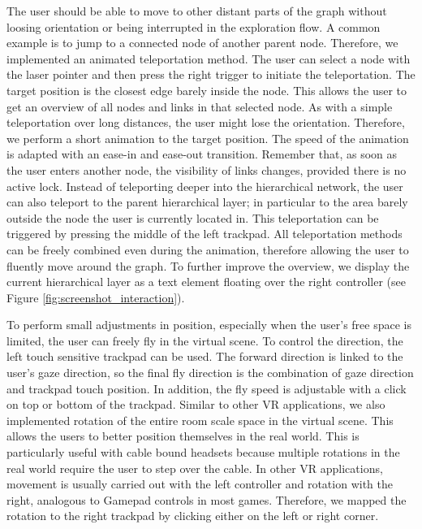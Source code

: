 The user should be able to move to other distant parts of the graph without loosing orientation or being interrupted in the exploration flow. A common example is to jump to a connected node of another parent node. 
Therefore, we implemented an animated teleportation method. The user can select a node with the laser pointer and then press the right trigger to initiate the teleportation. The target position is the closest edge barely inside the node. This allows the user to get an overview of all nodes and links in that selected node.   
As with a simple teleportation over long distances, the user might lose the orientation. Therefore, we perform a short animation to the target position. The speed of the animation is adapted with an ease-in and ease-out transition.
Remember that, as soon as the user enters another node, the visibility of links changes, provided there is no active lock.
Instead of teleporting deeper into the hierarchical network, the user can also teleport to the parent hierarchical layer; in particular to the area barely outside the node the user is currently located in. This teleportation can be triggered by pressing the middle of the left trackpad.
All teleportation methods can be freely combined even during the animation, therefore allowing the user to fluently move around the graph. 
To further improve the overview, we display the current hierarchical layer as a text element floating over the right controller (see Figure \ref{fig:screenshot_interaction}). 

To perform small adjustments in position, especially when the user's free space is limited, the user can freely fly in the virtual scene. To control the direction, the left touch sensitive trackpad can be used. 
The forward direction is linked to the user's gaze direction, so the final fly direction is the combination of gaze direction and trackpad touch position. 
In addition, the fly speed is adjustable with a click on top or bottom of the trackpad.    
Similar to other VR applications, we also implemented rotation of the entire room scale space in the virtual scene. This allows the users to better position themselves in the real world. 
This is particularly useful with cable bound headsets because multiple rotations in the real world require the user to step over the cable. In other VR applications, movement is usually carried out with the left controller and rotation with the right, analogous to Gamepad controls in most games. Therefore, we mapped the rotation to the right trackpad by clicking either on the left or right corner.

